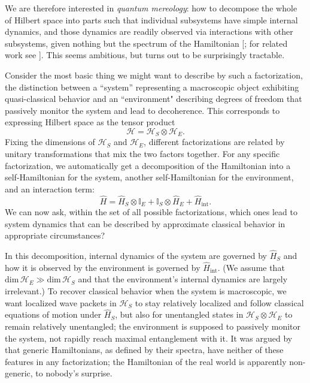 \documentclass[12pt,english]{article}
\newcommand{\be}{\begin{equation}}
\newcommand{\ee}{\end{equation}}
\newcommand{\ham}{\hat{H}}
\newcommand{\HH}{\mathcal{H}}
\begin{document}
We are therefore interested in \emph{quantum mereology}: how to decompose the whole of Hilbert space into parts such that individual subsystems have simple internal dynamics, and those dynamics are readily observed via interactions with other subsystems, given nothing but the spectrum of the Hamiltonian [\citep{Carroll:2018rhc}; for related work see \citep{brun1999classical,Hartle:2008mv,Tegmark:2014kka,Ney2020-NEYFTW}].
This seems ambitious, but turns out to be surprisingly tractable.

Consider the most basic thing we might want to describe by such a factorization, the distinction between a ``system''  representing a macroscopic object exhibiting quasi-classical behavior and an ``environment" describing degrees of freedom that passively monitor the system and lead to decoherence.
This corresponds to expressing Hilbert space as the tensor product
\be
  \HH = \HH_S \otimes \HH_E.
\ee
Fixing the dimensions of $\HH_S$ and $\HH_E$, different factorizations are related by unitary transformations that mix the two factors together.
For any specific factorization, we automatically get a decomposition of the Hamiltonian into a self-Hamiltonian for the system, another self-Hamiltonian for the environment, and an interaction term:
\be
  \ham = \ham_S \otimes \mathbb{I}_E + \mathbb{I}_S \otimes \ham_E + \ham_\mathrm{int}.
\ee
We can now ask, within the set of all possible factorizations, which ones lead to system dynamics that can be described by approximate classical behavior in appropriate circumstances?

In this decomposition, internal dynamics of the system are governed by $\ham_S$ and how it is observed by the environment is governed by $\ham_\mathrm{int}$.
(We assume that $\mathrm{dim}\,\HH_E \gg \mathrm{dim}\,\HH_S$ and that the environment's internal dynamics are largely irrelevant.)
To recover classical behavior when the system is macroscopic, we want localized wave packets in $\HH_S$ to stay relatively localized and follow classical equations of motion under $\ham_S$, but also for unentangled states in $\HH_S\otimes \HH_E$ to remain relatively unentangled; the environment is supposed to passively monitor the system, not rapidly reach maximal entanglement with it.
It was argued by \citet{Carroll:2018rhc} that generic Hamiltonians, as defined by their spectra, have neither of these features in any factorization; the Hamiltonian of the real world is apparently non-generic, to nobody's surprise.
\end{document}
